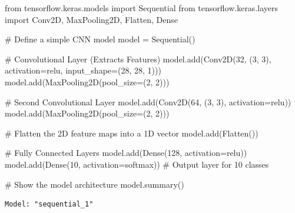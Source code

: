 \documentclass[
  letterpaper,
  DIV=11,
  numbers=noendperiod]{scrreprt}
\newenvironment{Shaded}{\begin{snugshade}}{\end{snugshade}}
\newcommand{\CommentTok}[1]{\textcolor[rgb]{0.37,0.37,0.37}{#1}}
\newcommand{\DecValTok}[1]{\textcolor[rgb]{0.68,0.00,0.00}{#1}}
\newcommand{\ImportTok}[1]{\textcolor[rgb]{0.00,0.46,0.62}{#1}}
\newcommand{\NormalTok}[1]{\textcolor[rgb]{0.00,0.23,0.31}{#1}}
\newcommand{\OperatorTok}[1]{\textcolor[rgb]{0.37,0.37,0.37}{#1}}
\newcommand{\StringTok}[1]{\textcolor[rgb]{0.13,0.47,0.30}{#1}}
\begin{document}
\begin{Shaded}
\begin{Highlighting}[]
\ImportTok{from}\NormalTok{ tensorflow.keras.models }\ImportTok{import}\NormalTok{ Sequential}
\ImportTok{from}\NormalTok{ tensorflow.keras.layers }\ImportTok{import}\NormalTok{ Conv2D, MaxPooling2D, Flatten, Dense}

\CommentTok{\# Define a simple CNN model}
\NormalTok{model }\OperatorTok{=}\NormalTok{ Sequential()}

\CommentTok{\# Convolutional Layer (Extracts Features)}
\NormalTok{model.add(Conv2D(}\DecValTok{32}\NormalTok{, (}\DecValTok{3}\NormalTok{, }\DecValTok{3}\NormalTok{), activation}\OperatorTok{=}\StringTok{\textquotesingle{}relu\textquotesingle{}}\NormalTok{, input\_shape}\OperatorTok{=}\NormalTok{(}\DecValTok{28}\NormalTok{, }\DecValTok{28}\NormalTok{, }\DecValTok{1}\NormalTok{)))}
\NormalTok{model.add(MaxPooling2D(pool\_size}\OperatorTok{=}\NormalTok{(}\DecValTok{2}\NormalTok{, }\DecValTok{2}\NormalTok{)))}

\CommentTok{\# Second Convolutional Layer}
\NormalTok{model.add(Conv2D(}\DecValTok{64}\NormalTok{, (}\DecValTok{3}\NormalTok{, }\DecValTok{3}\NormalTok{), activation}\OperatorTok{=}\StringTok{\textquotesingle{}relu\textquotesingle{}}\NormalTok{))}
\NormalTok{model.add(MaxPooling2D(pool\_size}\OperatorTok{=}\NormalTok{(}\DecValTok{2}\NormalTok{, }\DecValTok{2}\NormalTok{)))}

\CommentTok{\# Flatten the 2D feature maps into a 1D vector}
\NormalTok{model.add(Flatten())}

\CommentTok{\# Fully Connected Layers}
\NormalTok{model.add(Dense(}\DecValTok{128}\NormalTok{, activation}\OperatorTok{=}\StringTok{\textquotesingle{}relu\textquotesingle{}}\NormalTok{))}
\NormalTok{model.add(Dense(}\DecValTok{10}\NormalTok{, activation}\OperatorTok{=}\StringTok{\textquotesingle{}softmax\textquotesingle{}}\NormalTok{))  }\CommentTok{\# Output layer for 10 classes}

\CommentTok{\# Show the model architecture}
\NormalTok{model.summary()}
\end{Highlighting}
\end{Shaded}

\begin{verbatim}
Model: "sequential_1"
\end{verbatim}
\end{document}
